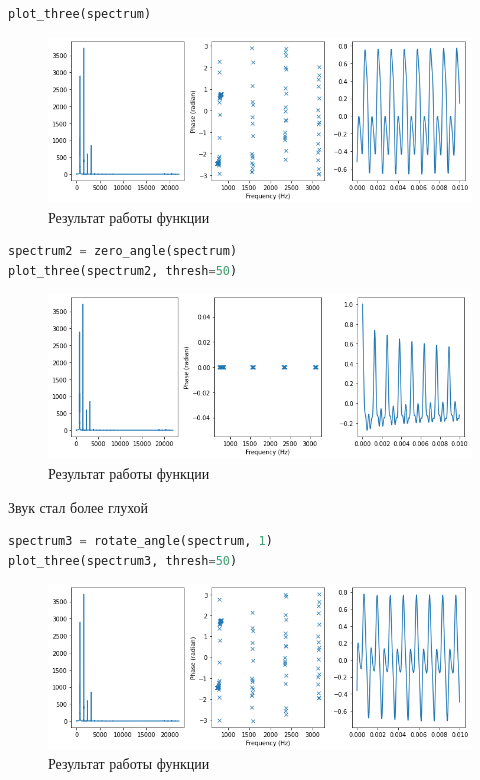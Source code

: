 \begin{lstlisting}[language=Python]
plot_three(spectrum)
\end{lstlisting}
\begin{figure}[H]
	\begin{center}
		\includegraphics[scale=0.66]{fig/lab06/lab06_10.png}
		\caption{Результат работы функции}
	\end{center}
\end{figure}

\begin{lstlisting}[language=Python]
spectrum2 = zero_angle(spectrum)
plot_three(spectrum2, thresh=50)
\end{lstlisting}
\begin{figure}[H]
	\begin{center}
		\includegraphics[scale=0.66]{fig/lab06/lab06_11.png}
		\caption{Результат работы функции}
	\end{center}
\end{figure}

Звук стал более глухой


\begin{lstlisting}[language=Python]
spectrum3 = rotate_angle(spectrum, 1)
plot_three(spectrum3, thresh=50)
\end{lstlisting}
\begin{figure}[H]
	\begin{center}
		\includegraphics[scale=0.66]{fig/lab06/lab06_12.png}
		\caption{Результат работы функции}
	\end{center}
\end{figure}


